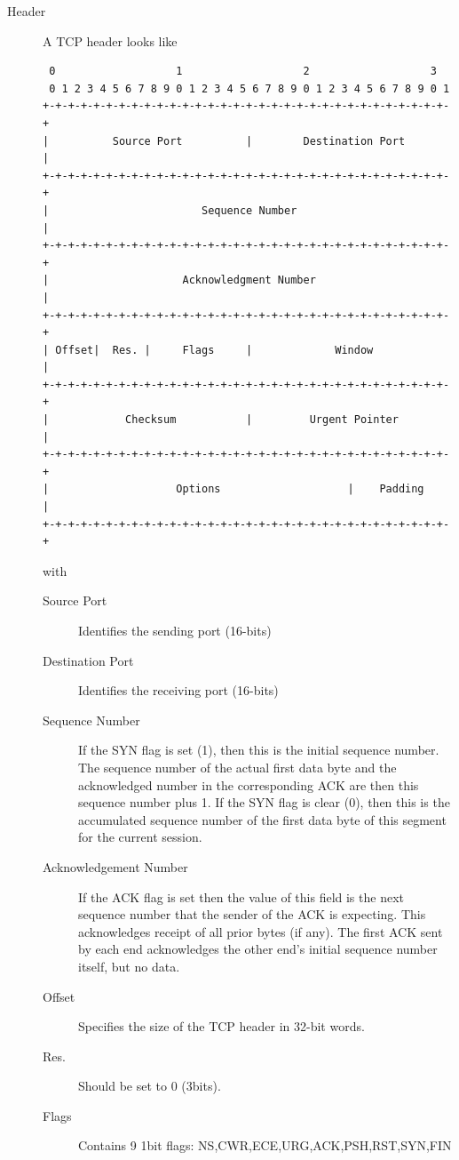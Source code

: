 \documentclass{article}
\begin{document}
\begin{description}
    \item[Header] A TCP header looks like
    \begin{lstlisting}
 0                   1                   2                   3
 0 1 2 3 4 5 6 7 8 9 0 1 2 3 4 5 6 7 8 9 0 1 2 3 4 5 6 7 8 9 0 1
+-+-+-+-+-+-+-+-+-+-+-+-+-+-+-+-+-+-+-+-+-+-+-+-+-+-+-+-+-+-+-+-+
|          Source Port          |        Destination Port       |
+-+-+-+-+-+-+-+-+-+-+-+-+-+-+-+-+-+-+-+-+-+-+-+-+-+-+-+-+-+-+-+-+
|                        Sequence Number                        |
+-+-+-+-+-+-+-+-+-+-+-+-+-+-+-+-+-+-+-+-+-+-+-+-+-+-+-+-+-+-+-+-+
|                     Acknowledgment Number                     |
+-+-+-+-+-+-+-+-+-+-+-+-+-+-+-+-+-+-+-+-+-+-+-+-+-+-+-+-+-+-+-+-+
| Offset|  Res. |     Flags     |             Window            |
+-+-+-+-+-+-+-+-+-+-+-+-+-+-+-+-+-+-+-+-+-+-+-+-+-+-+-+-+-+-+-+-+
|            Checksum           |         Urgent Pointer        |
+-+-+-+-+-+-+-+-+-+-+-+-+-+-+-+-+-+-+-+-+-+-+-+-+-+-+-+-+-+-+-+-+
|                    Options                    |    Padding    |
+-+-+-+-+-+-+-+-+-+-+-+-+-+-+-+-+-+-+-+-+-+-+-+-+-+-+-+-+-+-+-+-+
    \end{lstlisting}
    with
    \begin{description}
        \item[Source Port] Identifies the sending port (16-bits)
        \item[Destination Port] Identifies the receiving port (16-bits)
        \item[Sequence Number] If the SYN flag is set (1), then this is the initial sequence number.
        The sequence number of the actual first data byte and the acknowledged number in the
        corresponding ACK are then this sequence number plus 1. If the SYN flag is clear (0), then this
        is the accumulated sequence number of the first data byte of this segment for the current
        session.
        \item[Acknowledgement Number] If the ACK flag is set then the value of this field is the next
        sequence number that the sender of the ACK is expecting. This acknowledges receipt of all prior
        bytes (if any). The first ACK sent by each end acknowledges the other end's initial sequence
        number itself, but no data.
        \item[Offset] Specifies the size of the TCP header in 32-bit words. 
        \item[Res.] Should be set to 0 (3bits).
        \item[Flags] Contains 9 1bit flags: NS,CWR,ECE,URG,ACK,PSH,RST,SYN,FIN

\end{description}
\end{description}
\end{document}
